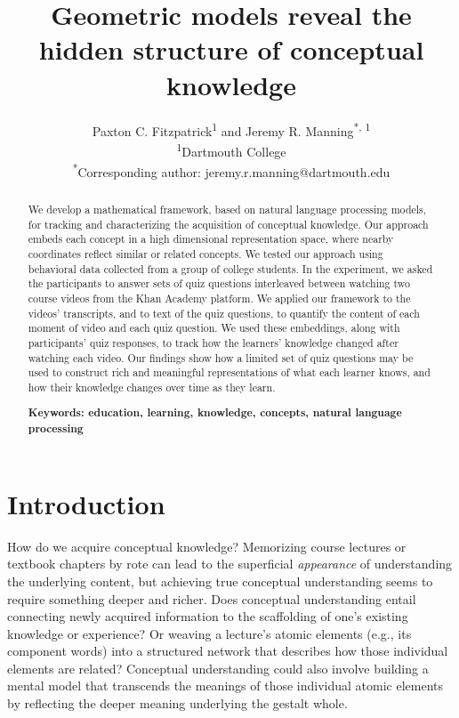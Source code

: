 \documentclass[10pt]{article}
\title{Geometric models reveal the hidden structure of conceptual knowledge}
\author{Paxton C. Fitzpatrick\textsuperscript{1} and Jeremy R.
Manning\textsuperscript{*, 1}\\\textsuperscript{1}Dartmouth
College\\\textsuperscript{*}Corresponding author:
jeremy.r.manning@dartmouth.edu}
\date{}
\begin{document}
\maketitle

\begin{abstract} We develop a mathematical framework, based on natural language
processing models, for tracking and characterizing the acquisition of
conceptual knowledge. Our approach embeds each concept in a high dimensional
representation space, where nearby coordinates reflect similar or related
concepts. We tested our approach using behavioral data collected from a group
of college students. In the experiment, we asked the participants to answer
sets of quiz questions interleaved between watching two course videos from the
Khan Academy platform. We applied our framework to the videos' transcripts, and
to text of the quiz questions, to quantify the content of each moment of video
and each quiz question. We used these embeddings, along with participants' quiz
responses, to track how the learners' knowledge changed after watching each
video. Our findings show how a limited set of quiz questions may be used to
construct rich and meaningful representations of what each learner knows, and
how their knowledge changes over time as they learn.

\textbf{Keywords: education, learning, knowledge, concepts, natural language processing}

\end{abstract}


\section*{Introduction}

How do we acquire conceptual knowledge? Memorizing course lectures or textbook
chapters by rote can lead to the superficial \textit{appearance} of
understanding the underlying content, but achieving true conceptual
understanding seems to require something deeper and richer. Does conceptual
understanding entail connecting newly acquired information to the scaffolding
of one's existing knowledge or experience? Or weaving a lecture's atomic
elements (e.g., its component words) into a structured network that describes
how those individual elements are related? Conceptual understanding could also
involve building a mental model that transcends the meanings of those
individual atomic elements by reflecting the deeper meaning underlying the
gestalt whole.
\end{document}
